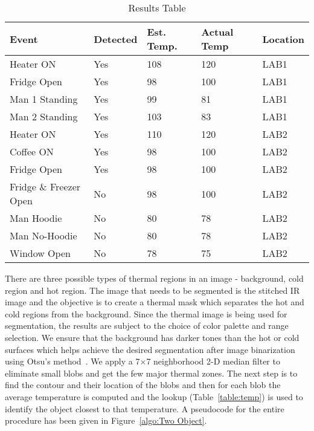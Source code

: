  \begin{table}[t!]
 	\centering
 	\begin{tabular}{||p{1.8cm} | p{1.2cm} | p{1.2cm}| p{1cm} | p{1cm}||}
 		\hline
 		Event & Detected & Est. Temp. & Actual Temp & Location\\ [0.5ex]
 		\hline\hline
 		Heater ON  & Yes & 108 &  120 & LAB1\\
 		\hline
 		Fridge Open  & Yes & 98 &  100 & LAB1\\
 		\hline
 		Man 1 Standing  & Yes & 99 &  81 & LAB1\\
 		\hline
 		Man 2 Standing  & Yes & 103 &  83  & LAB1\\
 		\hline
 		Heater ON  & Yes & 110 &  120 & LAB2\\
 		\hline
 		Coffee ON  & Yes & 98 &  100 & LAB2\\
 		\hline
 		Fridge Open  & Yes & 98 &  100 & LAB2\\
 		\hline
 		Fridge \& Freezer Open  & No & 98 &  100 & LAB2\\
 		\hline
 		Man Hoodie  & No & 80 &  78 & LAB2\\
 		\hline
 		Man No-Hoodie & No & 80 &  78 & LAB2\\
 		\hline
 		Window Open & No & 78 &  75 & LAB2\\
 		\hline\hline
 	\end{tabular}
 	\label{table:DetectionTable}
 	\caption{Results Table}
 \end{table}


 There are three possible types of thermal regions in an image - background, cold region and hot region. The image that needs to be segmented is the stitched IR image and the objective is to create a thermal mask which separates the hot and cold regions from the background. Since the thermal image is being used for segmentation, the results are subject to the choice of color palette and range selection.  We ensure that the background has darker tones than the hot or cold surfaces which helps achieve the desired segmentation after image binarization using Otsu's method~\cite{Otsu}. We apply a 7$\times$7 neighborhood 2-D median filter to eliminate small blobs and get the few major thermal zones. The next step is to find the contour and their location of the blobs and then for each blob the average temperature is computed and the lookup (Table~\ref{table:temp}) is used to identify the object closest to that temperature. A pseudocode for the entire procedure has been given in Figure~\ref{algo:Two Object}.
 


